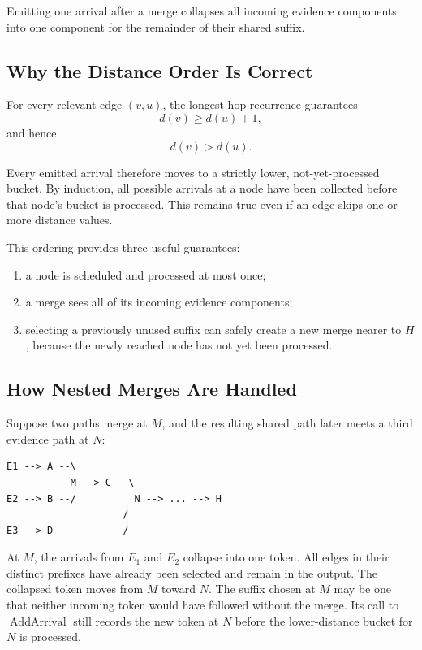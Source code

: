 \documentclass[11pt]{article}
\begin{document}
Emitting one arrival after a merge collapses all incoming evidence components
into one component for the remainder of their shared suffix.

\subsection{Why the Distance Order Is Correct}

For every relevant edge \((v,u)\), the longest-hop recurrence guarantees
\[
    d(v) \geq d(u)+1,
\]
and hence
\[
    d(v)>d(u).
\]

Every emitted arrival therefore moves to a strictly lower, not-yet-processed
bucket.  By induction, all possible arrivals at a node have been collected
before that node's bucket is processed.  This remains true even if an edge
skips one or more distance values.

This ordering provides three useful guarantees:

\begin{enumerate}
    \item a node is scheduled and processed at most once;
    \item a merge sees all of its incoming evidence components;
    \item selecting a previously unused suffix can safely create a new merge
          nearer to \(H\), because the newly reached node has not yet been
          processed.
\end{enumerate}

\subsection{How Nested Merges Are Handled}

Suppose two paths merge at \(M\), and the resulting shared path later meets a
third evidence path at \(N\):

\begin{verbatim}
E1 --> A --\
           M --> C --\
E2 --> B --/          N --> ... --> H
                    /
E3 --> D -----------/
\end{verbatim}

At \(M\), the arrivals from \(E_1\) and \(E_2\) collapse into one token.  All
edges in their distinct prefixes have already been selected and remain in the
output.  The collapsed token moves from \(M\) toward \(N\).
The suffix chosen at \(M\) may be one that neither incoming token would have
followed without the merge.  Its call to \(\operatorname{AddArrival}\) still
records the new token at \(N\) before the lower-distance bucket for \(N\) is
processed.
\end{document}
